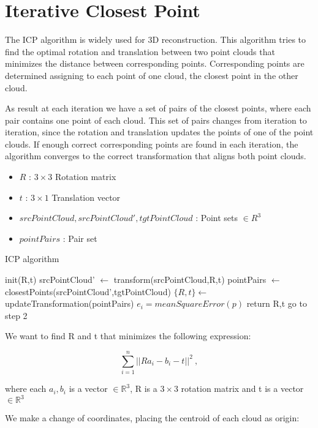 
\section{Iterative Closest Point}

The ICP algorithm \cite{mckay92} is widely used for 3D reconstruction. This algorithm tries to find 
the optimal rotation and translation between two point clouds that minimizes the distance between corresponding 
points. Corresponding points are determined assigning to each point of one cloud, the closest point in the other cloud.

As result at each iteration we have a set of pairs of the closest points, where each pair contains one point of each cloud. This set 
of pairs changes from iteration to iteration, since the rotation and translation updates the points of one of the point clouds. If enough correct 
corresponding points are found in each iteration, the algorithm converges to the correct transformation that aligns both point clouds.


\begin{itemize}
\item $R$ : $3\times3$ Rotation matrix
\item $t$ : $3\times1$ Translation vector
\item $srcPointCloud,srcPointCloud',tgtPointCloud$ : Point sets $\in R^3$
\item $pointPairs$ : Pair set
\end{itemize}
\begin{algorithm}
\caption{ICP algorithm}
\begin{algorithmic}[1]
\State init(R,t)
\State srcPointCloud' $\leftarrow$ transform(srcPointCloud,R,t) 
\State pointPairs $\leftarrow$ closestPoints(srcPointCloud',tgtPointCloud)
\State $\{R,t\} \gets$ updateTransformation(pointPairs)
\State $e_i = meanSquareError(p)$
	\State return R,t
\Else
	\State go to step 2
\EndIf
\end{algorithmic}
\end{algorithm}


We want to find R and t that minimizes the following expression:

$$ \sum\limits_{i=1}^n ||R a_i -  b_i - t ||^2 \ ,$$

\noindent where each $a_i,b_i$ is a vector $\in \mathbb{R}^3$, R is a $3\times3$ rotation matrix and t is a vector $\in \mathbb{R}^3$


We make a change of coordinates, placing the centroid of each cloud as origin:



